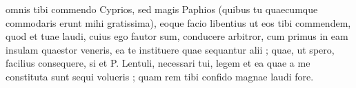 


omnis tibi commendo Cyprios, sed magis Paphios (quibus tu quaecumque commodaris erunt mihi gratissima),
eoque facio libentius ut eos tibi commendem, quod et tuae laudi, cuius ego fautor sum, conducere arbitror, cum primus in eam insulam quaestor veneris, ea te instituere quae
sequantur alii ; quae, ut spero, facilius consequere, si et
P. Lentuli, necessari tui, legem et ea quae a me constituta sunt sequi volueris ; quam rem tibi confido magnae laudi fore.
